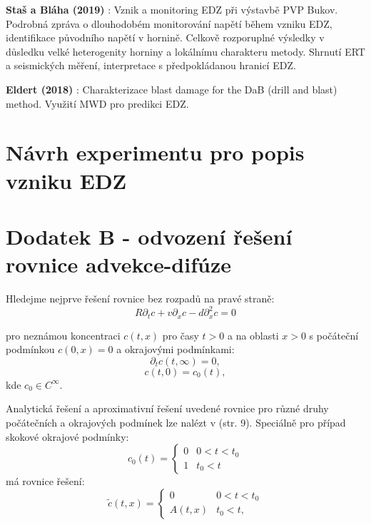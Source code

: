 \documentclass{article}
\def\prtl{\partial}
\begin{document}
{\bf Staš a Bláha (2019)} \cite{SURAO_351/2019}: Vznik a monitoring EDZ při výstavbě PVP Bukov.
Podrobná zpráva o dlouhodobém monitorování napětí během vzniku EDZ, identifikace původního napětí v hornině. Celkově rozporuplné výsledky v důsledku velké heterogenity horniny a lokálnímu charakteru metody. Shrnutí ERT a seismických měření, interpretace s předpokládanou hranicí EDZ.  

{\bf Eldert (2018)} \cite{JeroenvanEldert2018}: Charakterizace blast damage for the DaB (drill and blast) method. Využití MWD pro predikci EDZ.

\section{Návrh experimentu pro popis vzniku EDZ}

\label{sec:experiment}



\pagebreak






\section*{Dodatek B - odvození řešení rovnice advekce-difúze}
Hledejme nejprve řešení rovnice bez rozpadů na pravé straně:
\begin{equation}
    \label{eq:no_decay_ad}
    R\prtl_t c + v \prtl_x c - d \prtl^2_x c = 0
\end{equation}

pro neznámou koncentraci $c(t, x)$ pro časy $t>0$ a na oblasti $x>0$ s počáteční podmínkou $c(0, x) = 0$ a
okrajovými podmínkami:
\[
    \prtl_t c(t, \infty) = 0,
\]
\[
    c(t, 0) = c_0(t),
\]
kde $c_0 \in C^\infty$.

Analytická řešení a aproximativní řešení uvedené rovnice pro různé druhy počátečních
a okrajových podmínek lze nalézt v \cite{Genuchten1982} (str. 9). 
Speciálně pro případ skokové okrajové podmínky:
\begin{equation}
    \label{eq:jump_bc}
    c_0(t) = \left\{\begin{array}{ll}
         0 & 0 < t < t_0 \\
         1   & t_0 < t
    \end{array}\right. 
\end{equation}
má rovnice řešení:
\begin{equation}
    \label{eq:jump_sol}
    \tilde c(t, x) = 
    \left\{\begin{array}{ll}
         0                     & 0 < t < t_0 \\
         A(t,x)   & t_0 < t,
    \end{array}\right. 
\end{equation}
\end{document}
